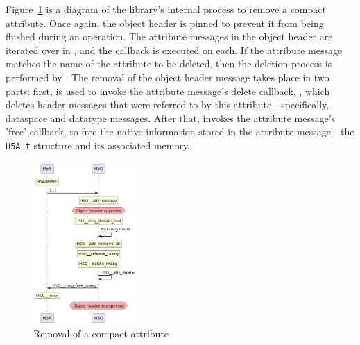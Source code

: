 Figure~\ref{fig:tour-3-uml-attr-remove-compact} is a diagram of the library's internal process to remove a compact attribute. Once again, the object header is pinned to prevent it from being flushed during an operation. The attribute messages in the object header are iterated over in , and the callback  is executed on each. If the attribute message matches the name of the attribute to be deleted, then the deletion process is performed by . The removal of the object header message takes place in two parts: first,  is used to invoke the attribute message's delete callback, , which deletes header messages that were referred to by this attribute - specifically, dataspace and datatype messages. After that,  invokes the attribute message's 'free' callback, to free the native information stored in the attribute message - the \texttt{H5A\_t} structure and its associated memory.

\begin{figure}
    \centering
    \includegraphics[width=0.35\textwidth]{images/tour_3_uml_attr_remove_compact.png}
    \caption{Removal of a compact attribute}
    \label{fig:tour-3-uml-attr-remove-compact}
\end{figure}

